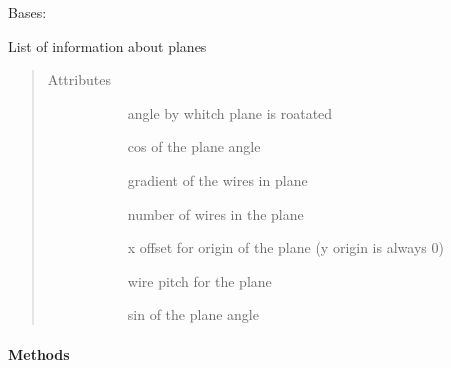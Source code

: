 \documentclass[letterpaper,10pt,english]{sphinxmanual}
\begin{document}
\begin{fulllineitems}
\label{\detokenize{dataTypes:dataTypes.PlaneInfo}}
Bases: 

List of information about planes
\begin{quote}\begin{description}
\item[{Attributes}] \leavevmode\begin{description}
\item[{{\hyperref[\detokenize{dataTypes:dataTypes.PlaneInfo.angle}]{}}}] \leavevmode
angle by whitch plane is roatated

\item[{{\hyperref[\detokenize{dataTypes:dataTypes.PlaneInfo.cos}]{}}}] \leavevmode
cos of the plane angle

\item[{{\hyperref[\detokenize{dataTypes:dataTypes.PlaneInfo.gradient}]{}}}] \leavevmode
gradient of the wires in plane

\item[{{\hyperref[\detokenize{dataTypes:dataTypes.PlaneInfo.noOfWires}]{}}}] \leavevmode
number of wires in the plane

\item[{{\hyperref[\detokenize{dataTypes:dataTypes.PlaneInfo.originTranslation}]{}}}] \leavevmode
x offset for origin of the plane (y origin is always 0)

\item[{{\hyperref[\detokenize{dataTypes:dataTypes.PlaneInfo.pitch}]{}}}] \leavevmode
wire pitch for the plane

\item[{{\hyperref[\detokenize{dataTypes:dataTypes.PlaneInfo.sin}]{}}}] \leavevmode
sin of the plane angle

\end{description}

\end{description}\end{quote}
\paragraph{Methods}



\end{fulllineitems}
\end{document}
